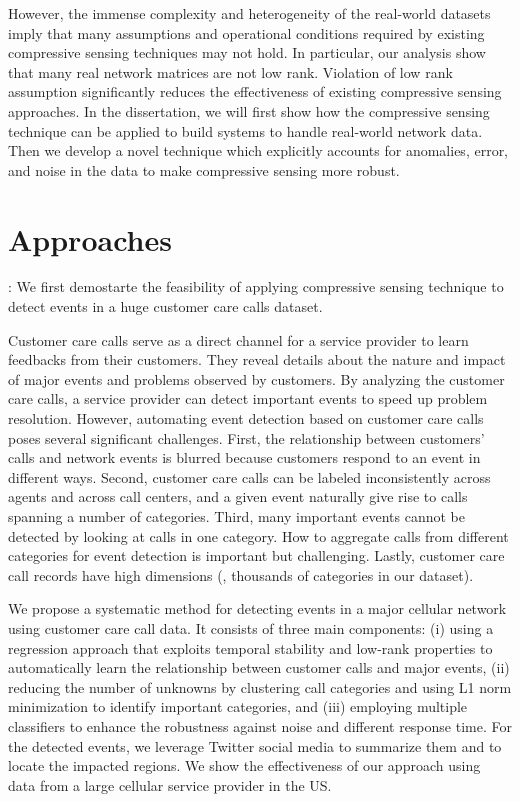 However, the immense complexity and heterogeneity of the real-world datasets imply that many assumptions and operational conditions required by existing compressive sensing techniques may not hold. In particular, our analysis show that many real network matrices are not low rank. Violation of low rank assumption significantly reduces the effectiveness of existing compressive sensing approaches. In the dissertation, we will first show how the compressive sensing technique can be applied to build systems to handle real-world network data. Then we develop a novel technique which explicitly accounts for anomalies, error, and noise in the data to make compressive sensing more robust. 


\section{Approaches}
\label{sec:approach}

: We first demostarte the feasibility of applying compressive sensing technique to detect events in a huge customer care calls dataset. 

Customer care calls serve as a direct channel for a service provider to learn feedbacks from their customers. They reveal details about the nature and impact of major events and problems observed by customers. By analyzing the customer care calls, a service provider can detect important events to speed up problem resolution. However, automating event detection based on customer care calls poses several significant challenges. First, the relationship between customers’ calls and network events is blurred because customers respond to an event in different ways. Second, customer care calls can be labeled inconsistently across agents and across call centers, and a given event naturally give rise to calls spanning a number of categories. Third, many important events cannot be detected by looking at calls in one category. How to aggregate calls from different categories for event detection is important but challenging. Lastly, customer care call records have high dimensions (\eg, thousands of categories in our dataset).

We propose a systematic method for detecting events in a major cellular network using customer care call data. It consists of three main components: (i) using a regression approach that exploits temporal stability and low-rank properties to automatically learn the relationship between customer calls and major events, (ii) reducing the number of unknowns by clustering call categories and using L1 norm minimization to identify important categories, and (iii) employing multiple classifiers to enhance the robustness against noise and different response time. For the detected events, we leverage Twitter social media to summarize them and to locate the impacted regions. We show the effectiveness of our approach using data from a large cellular service provider in the US.

